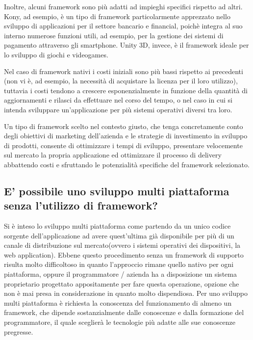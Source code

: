 Inoltre, alcuni framework sono più adatti ad impieghi specifici rispetto ad altri. Kony, ad esempio, è un tipo di framework particolarmente apprezzato nello sviluppo di applicazioni per il settore bancario e financial, poichè integra al suo interno numerose funzioni utili, ad esempio, per la gestione dei sistemi di pagamento attraverso gli smartphone. Unity 3D, invece, è il framework ideale per lo sviluppo di giochi e videogames.

Nel caso di framework nativi i costi iniziali sono più bassi rispetto ai precedenti (non vi è, ad esempio, la necessità di acquistare la licenza per il loro utilizzo), tuttavia i costi tendono a crescere esponenzialmente in funzione della quantità di aggiornamenti e rilasci da effettuare nel corso del tempo, o  nel caso in cui si intenda sviluppare un’applicazione per più sistemi operativi diversi tra loro.

Un tipo di framework scelto nel contesto giusto, che tenga concretamente conto degli obiettivi di marketing dell'azienda e le strategie di investimento in sviluppo di prodotti, consente di ottimizzare i tempi di sviluppo, presentare velocemente sul mercato la propria applicazione ed ottimizzare il processo di delivery abbattendo costi e sfruttando le potenzialità specifiche del framework selezionato.

\subsection{E' possibile uno sviluppo multi piattaforma senza l'utilizzo di framework?}

Si è inteso lo sviluppo multi piattaforma come partendo da un unico codice sorgente dell'applicazione ad avere quest'ultima già disponibile per più di un canale di distribuzione sul mercato(ovvero i sistemi operativi dei dispositivi, la web application). Ebbene questo procedimento senza un framework di supporto risulta molto difficoltoso in quanto l'approccio rimane quello nativo per ogni piattaforma, oppure il programmatore / azienda ha a disposizione un sistema proprietario progettato appositamente per fare questa operazione, opzione che non è mai presa in considerazione in quanto molto dispendiosa.
Per uno sviluppo multi piattaforma è richiesta la conoscenza del funzionamento di almeno un framework, che dipende sostanzialmente dalle conoscenze e dalla formazione del programmatore, il quale sceglierà le tecnologie più adatte alle sue conoscenze pregresse.
  


   







